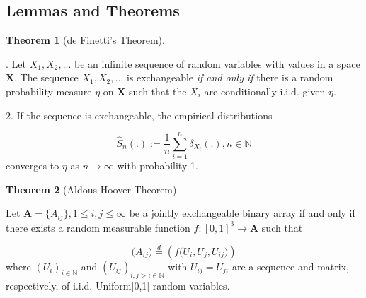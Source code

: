 \documentclass[12pt]{article}
\theoremstyle{definition}
\newtheorem{theorem}{Theorem}[section]
\begin{document}
\newpage
\subsection{Lemmas and Theorems}
	
\begin{theorem}[de Finetti's Theorem] 
	\label{finetti}
	
. Let $X_{1}, X_{2}, ...$ be an infinite sequence of random variables with values in a space $\mathbf{X}$. The sequence $X_{1}, X_{2}, ...$ is exchangeable \textit{if and only if} there is a random probability measure $\eta$ on $\mathbf{X}$ such that the $X_{i}$ are conditionally i.i.d. given $\eta$. 
		
2. If the sequence is exchangeable, the empirical distributions
		
$$\hat{S}_{n} ( . ) := \frac{1}{n} \sum\limits_{i=1}^{n} \delta_{X_{i}} ( .), n \in \mathbb{N}$$
		converges to $\eta$ as $n \rightarrow \infty$ with probability 1.
\end{theorem}
	
\begin{theorem}[Aldous Hoover Theorem]
		\label{Aldous_Hoover}
		
		Let $\mathbf{A} = \{A_{ij}\}, 1 \leq i,j \leq \infty$ be a jointly exchangeable binary array if and only if there exists a random measurable function $f : [0,1]^{3} \rightarrow \mathbf{A}$ such that 
		
		\begin{equation}
		\big(  A_{ij}  \big) \stackrel{d}{=} \left( f \big( U_{i}, U_{j}, U_{ij} \big)  \right)
		\end{equation}
		where $(U_{i})_{i \in \mathbb{N}}$ and $(U_{ij})_{i,j > i \in \mathbb{N}}$ with $U_{ij} = U_{ji}$ are a sequence and matrix, respectively, of i.i.d. Uniform[0,1] random variables. 
\end{theorem}
	
\end{document}
